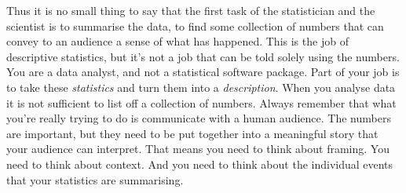 Thus it is no small thing to say that the first task of the statistician and the scientist is to summarise the data, to find some collection of numbers that can convey to an audience a sense of what has happened. This is the job of descriptive statistics, but it's not a job that can be told solely using the numbers. You are a data analyst, and not a statistical software package. Part of your job is to take these {\it statistics} and turn them into a {\it description}. When you analyse data it is not sufficient to list off a collection of numbers. Always remember that what you're really trying to do is communicate with a human audience. The numbers are important, but they need to be put together into a meaningful story that your audience can interpret. That means you need to think about framing. You need to think about context. And you need to think about the individual events that your statistics are summarising. 


